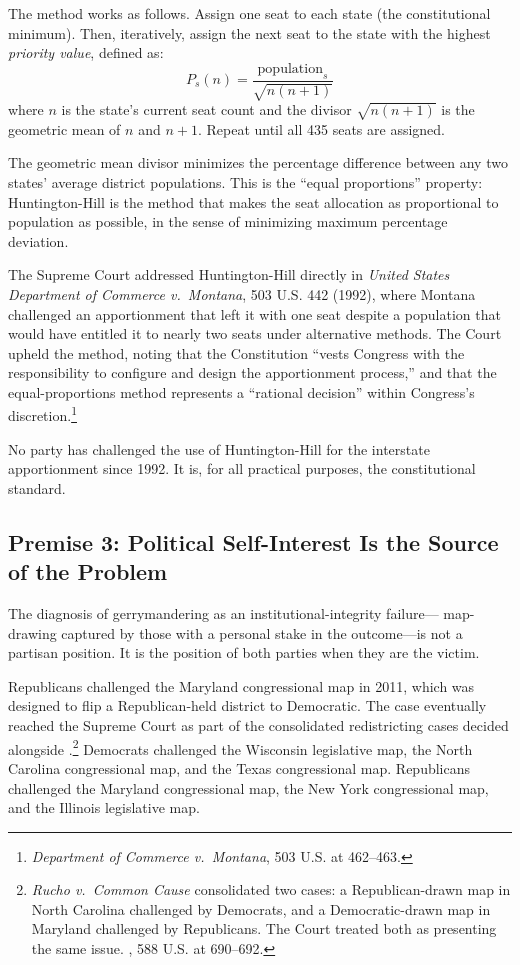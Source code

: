 The method works as follows.
Assign one seat to each state (the constitutional minimum).
Then, iteratively, assign the next seat to the state with the highest
\emph{priority value}, defined as:
\[
  P_s(n) = \frac{\text{population}_s}{\sqrt{n(n+1)}}
\]
where $n$ is the state's current seat count and the divisor
$\sqrt{n(n+1)}$ is the geometric mean of $n$ and $n+1$.
Repeat until all 435 seats are assigned.

The geometric mean divisor minimizes the percentage difference between
any two states' average district populations.
This is the ``equal proportions'' property: Huntington-Hill is the method
that makes the seat allocation as proportional to population as possible,
in the sense of minimizing maximum percentage deviation.

The Supreme Court addressed Huntington-Hill directly in
\textit{United States Department of Commerce v.\ Montana},
503 U.S. 442 (1992), where Montana challenged an apportionment that
left it with one seat despite a population that would have entitled it to
nearly two seats under alternative methods.
The Court upheld the method, noting that the Constitution ``vests Congress
with the responsibility to configure and design the apportionment process,''
and that the equal-proportions method represents a ``rational decision'' within
Congress's discretion.\footnote{%
  \textit{Department of Commerce v.\ Montana}, 503 U.S. at 462--463.
}

No party has challenged the use of Huntington-Hill for the interstate
apportionment since 1992.
It is, for all practical purposes, the constitutional standard.

\subsection{Premise 3: Political Self-Interest Is the Source of the Problem}

The diagnosis of gerrymandering as an institutional-integrity failure---
map-drawing captured by those with a personal stake in the outcome---is not
a partisan position.
It is the position of both parties when they are the victim.

Republicans challenged the Maryland congressional map in 2011, which was
designed to flip a Republican-held district to Democratic.
The case eventually reached the Supreme Court as part of the consolidated
redistricting cases decided alongside \rucho{}.\footnote{%
  \textit{Rucho v.\ Common Cause} consolidated two cases: a Republican-drawn
  map in North Carolina challenged by Democrats, and a Democratic-drawn map
  in Maryland challenged by Republicans.
  The Court treated both as presenting the same issue.
  \rucho{}, 588 U.S. at 690--692.
}
Democrats challenged the Wisconsin legislative map, the North Carolina
congressional map, and the Texas congressional map.
Republicans challenged the Maryland congressional map, the New York
congressional map, and the Illinois legislative map.

